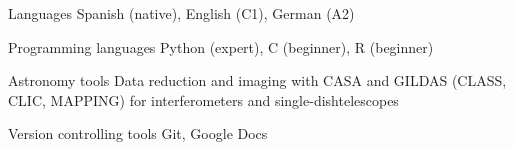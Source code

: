 

\begin{cvskills}

  \cvskill
    {Languages} %
    {Spanish (native), English (C1), German (A2)} %
    

  \cvskill
    {Programming languages} %
    {Python (expert), C (beginner), R (beginner)} %


  \cvskill
    {Astronomy tools} %
    {Data reduction and imaging with CASA and GILDAS (CLASS, CLIC, MAPPING) for interferometers and single-dish\newline telescopes} %


  \cvskill
    {Version controlling tools} %
    {Git, Google Docs} %


\end{cvskills}
